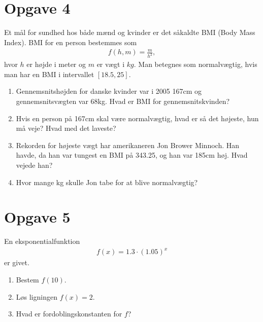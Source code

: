 \section*{Opgave 4}
Et mål for sundhed hos både mænd og kvinder er det såkaldte BMI (Body Mass Index). BMI for en person bestemmes som
\begin{align*}
f(h,m) = \frac{m}{h^2},
\end{align*}
hvor $h$ er højde i meter og $m$ er vægt i $kg$. Man betegnes som normalvægtig, hvis man har en BMI i intervallet $[18.5,25]$. 
\begin{enumerate}
\item Gennemsnitshøjden for danske kvinder var i 2005 167cm og gennemsnitsvægten var 68kg. Hvad er BMI for gennemsnitskvinden?
\item Hvis en person på 167cm skal være normalvægtig, hvad er så det højeste, hun må veje? Hvad med det laveste?
\item Rekorden for højeste vægt har amerikaneren Jon Brower Minnoch. Han havde, da han var tungest en BMI på 343.25, og han var 185cm høj. Hvad vejede han?
\item Hvor mange kg skulle Jon tabe for at blive normalvægtig?
\end{enumerate}

\section*{Opgave 5}
En eksponentialfunktion
\begin{align*}
f(x) = 1.3\cdot (1.05)^x
\end{align*}
er givet. 
\begin{enumerate}[label=\roman*)]
\item Bestem $f(10)$.
\item Løs ligningen $f(x) = 2$.
\item Hvad er fordoblingskonstanten for $f$?
\end{enumerate}
